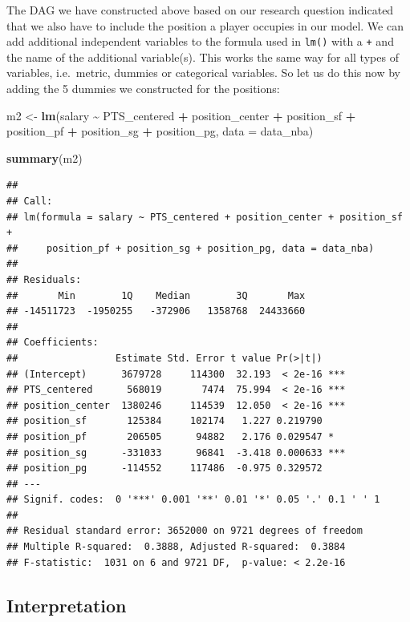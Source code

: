 \documentclass[
]{book}
\newenvironment{Shaded}{\begin{snugshade}}{\end{snugshade}}
\newcommand{\AttributeTok}[1]{\textcolor[rgb]{0.13,0.29,0.53}{#1}}
\newcommand{\FunctionTok}[1]{\textcolor[rgb]{0.13,0.29,0.53}{\textbf{#1}}}
\newcommand{\NormalTok}[1]{#1}
\newcommand{\OtherTok}[1]{\textcolor[rgb]{0.56,0.35,0.01}{#1}}
\newcommand{\SpecialCharTok}[1]{\textcolor[rgb]{0.81,0.36,0.00}{\textbf{#1}}}
\begin{document}
The DAG we have constructed above based on our research question indicated that
we also have to include the position a player occupies in our model.
We can add additional independent variables to the formula used in \texttt{lm()} with a
\texttt{+} and the name of the additional variable(s). This works the same way for all
types of variables, i.e.~metric, dummies or categorical variables.
So let us do this now by adding the 5 dummies we constructed for the positions:

\begin{Shaded}
\begin{Highlighting}[]
\NormalTok{m2 }\OtherTok{\textless{}{-}} \FunctionTok{lm}\NormalTok{(salary }\SpecialCharTok{\textasciitilde{}}\NormalTok{ PTS\_centered }\SpecialCharTok{+}\NormalTok{ position\_center }\SpecialCharTok{+}\NormalTok{ position\_sf }\SpecialCharTok{+}\NormalTok{  position\_pf }\SpecialCharTok{+}\NormalTok{ position\_sg }\SpecialCharTok{+}\NormalTok{ position\_pg, }\AttributeTok{data =}\NormalTok{ data\_nba)}

\FunctionTok{summary}\NormalTok{(m2)}
\end{Highlighting}
\end{Shaded}

\begin{verbatim}
## 
## Call:
## lm(formula = salary ~ PTS_centered + position_center + position_sf + 
##     position_pf + position_sg + position_pg, data = data_nba)
## 
## Residuals:
##       Min        1Q    Median        3Q       Max 
## -14511723  -1950255   -372906   1358768  24433660 
## 
## Coefficients:
##                 Estimate Std. Error t value Pr(>|t|)    
## (Intercept)      3679728     114300  32.193  < 2e-16 ***
## PTS_centered      568019       7474  75.994  < 2e-16 ***
## position_center  1380246     114539  12.050  < 2e-16 ***
## position_sf       125384     102174   1.227 0.219790    
## position_pf       206505      94882   2.176 0.029547 *  
## position_sg      -331033      96841  -3.418 0.000633 ***
## position_pg      -114552     117486  -0.975 0.329572    
## ---
## Signif. codes:  0 '***' 0.001 '**' 0.01 '*' 0.05 '.' 0.1 ' ' 1
## 
## Residual standard error: 3652000 on 9721 degrees of freedom
## Multiple R-squared:  0.3888, Adjusted R-squared:  0.3884 
## F-statistic:  1031 on 6 and 9721 DF,  p-value: < 2.2e-16
\end{verbatim}

\hypertarget{interpretation-1}{%
\subsection{Interpretation}\label{interpretation-1}}
\end{document}
